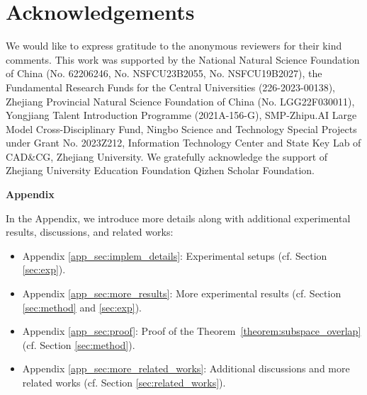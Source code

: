 \documentclass{article}
\begin{document}
\section*{Acknowledgements}

We would like to express gratitude to the anonymous reviewers for their kind comments. 
This work was supported by the National Natural Science Foundation of China (No. 62206246, No. NSFCU23B2055, No. NSFCU19B2027), the Fundamental Research Funds for the Central Universities (226-2023-00138), Zhejiang Provincial Natural Science Foundation of China (No. LGG22F030011), Yongjiang Talent Introduction Programme (2021A-156-G), SMP-Zhipu.AI Large Model Cross-Disciplinary Fund, Ningbo Science and Technology Special Projects under Grant No. 2023Z212, Information Technology Center and State Key Lab of CAD\&CG, Zhejiang University.
We gratefully acknowledge the support of Zhejiang University Education Foundation Qizhen Scholar Foundation.







\newpage
\appendix


\begin{center}
\Large
\textbf{Appendix}
\end{center}



In the Appendix, we introduce more details  along with additional experimental results, discussions, and related works:

\begin{itemize}
\item Appendix \ref{app_sec:implem_details}: Experimental setups (cf. Section \ref{sec:exp}).
\item Appendix \ref{app_sec:more_results}: More experimental results (cf. Section \ref{sec:method} and \ref{sec:exp}).
\item Appendix \ref{app_sec:proof}: Proof of the Theorem~\ref{theorem:subspace_overlap} (cf. Section \ref{sec:method}).
\item Appendix \ref{app_sec:more_related_works}: Additional discussions and more related works (cf. Section \ref{sec:related_works}).
\end{itemize}
\end{document}
